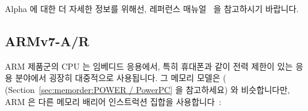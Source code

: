 Alpha 에 대한 더 자세한 정보를 위해선, 레퍼런스 매뉴얼~\cite{ALPHA2002} 을
참고하시기 바랍니다.

\subsection{ARMv7-A/R}
\label{sec:memorder:ARMv7-A/R}

ARM 제품군의 CPU 는 임베디드 응용에서, 특히 휴대폰과 같이 전력 제한이 있는 응용
분야에서 굉장히 대중적으로 사용됩니다.
그 메모리 모델은 \Power{}(
(Section~\ref{sec:memorder:POWER / PowerPC} 을 참고하세요) 와 비슷합니다만, ARM
은 다른 메모리 배리어 인스트럭션 집합을 사용합니다~\cite{ARMv7A:2010}:

